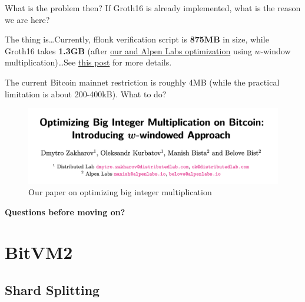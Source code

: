 \documentclass{zkdl-presentation-template}
\begin{document}
    \begin{frame}{What is the problem then?}
        If Groth16 is already implemented, what is the reason we are here?\pause

        The thing is\ldots Currently, fflonk verification script is \textbf{875MB} in size, while Groth16 takes \textbf{1.3GB} (after \href{https://eprint.iacr.org/2024/1236}{\textcolor{blue!70!white}{our and Alpen Labs optimization}} using $w$-window multiplication)\ldots See \href{https://x.com/fiamma_chain/status/1830824142826086608?s=46}{\textcolor{blue!70!white}{this post}} for more details.

        The current Bitcoin mainnet restriction is roughly 4MB (while the practical limitation is about 200-400kB). What to do?

        \begin{figure}
            \centering
            \includegraphics[width=\linewidth]{images/w_mul.png}
            \caption{Our paper on optimizing big integer multiplication}
            \label{fig:w_mul}
        \end{figure}
    \end{frame}

    \begin{frame}
        \centering
        \LARGE
        \textbf{Questions before moving on?}
    \end{frame}

    \section{BitVM2}

    \subsection{Shard Splitting}
\end{document}
